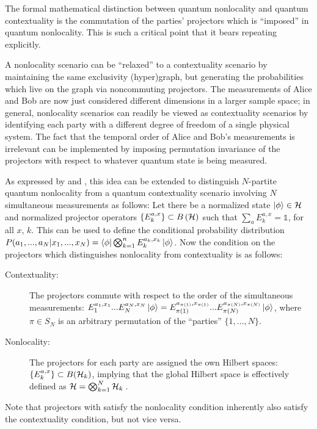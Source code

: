 \documentclass[
  12pt          %
  ,letterpaper  %
  ,center       %
  ,noupper      %
  ,english,fleqn]{uconnthesis}
\newcommand {\id}[0]{\ensuremath{\mathds{1}}}
\begin{document}
The formal mathematical distinction between quantum nonlocality and quantum contextuality is the commutation of the parties' projectors which is ``imposed'' in quantum nonlocality. This is such a critical point that it bears repeating explicitly.

A nonlocality scenario can be ``relaxed'' to a contextuality scenario by maintaining the same exclusivity (hyper)graph, but generating the probabilities which live on the graph via noncommuting projectors. The measurements of Alice and Bob are now just considered different dimensions in a larger sample space; in general, nonlocality scenarios can readily be viewed as contextuality scenarios by identifying each party with a different degree of freedom of a single physical system. The fact that the temporal order of Alice and Bob's measurements is irrelevant can be implemented by imposing permutation invariance of the projectors with respect to whatever quantum state is being measured. 

As expressed by \citet{FritzCombinatorialLong} and \citet{AlmostQuantum2}, this idea can be extended to distinguish $N$-partite quantum nonlocality from a quantum contextuality scenario involving $N$ simultaneous measurements as follows: Let there be a normalized state \(\ket{\phi}\in {\cal H}\) and normalized projector operators \(\{E^{a,x}_k\}\subset B\left( {\cal H}\right)\) such that \(\sum_a E_k^{a,x}=\id\), for all $x$, $k$. This can be used to define the conditional probability distribution $P(a_1,...,a_N|x_1,...,x_N)=\bra{\phi}\bigotimes_{k=1}^n E^{a_k,x_k}_k\ket{\phi}$. Now the condition on the projectors which distinguishes nonlocality from contextuality is as follows:

\begin{description}
 \item[Contextuality:] The projectors commute with respect to the order of the simultaneous measurements: \(E^{a_1,x_1}_1...E^{a_N,x_N}_N\ket{\phi}=E^{a_{\pi(1)},x_{\pi(1)}}_{\pi(1)}...E^{a_{\pi(N)},x_{\pi(N)}}_{\pi(N)}\ket{\phi}\), where \(\pi\in S_N\) is an arbitrary permutation of the ``parties'' \(\{1,...,N\}\).
 \item[Nonlocality:]  The projectors for each party are assigned the own Hilbert spaces: \(\{E^{a,x}_k\}\subset B({\cal H}_k)\), implying that the global Hilbert space is effectively defined as \({\cal H} = \bigotimes_{k=1}^N {\cal H}_k\,\).
\end{description}
Note that projectors with satisfy the nonlocality condition inherently also satisfy the contextuality condition, but not vice versa. 
\end{document}
